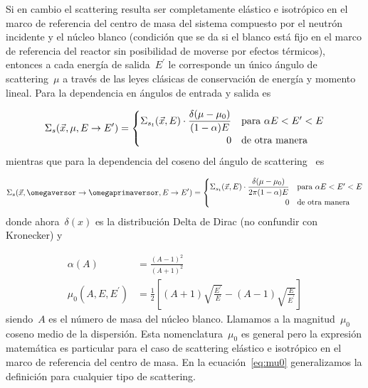 \medskip

Si en cambio el scattering resulta ser completamente elástico e isotrópico en el marco de referencia del centro de masa del sistema compuesto por el neutrón incidente y el núcleo blanco (condición que se da si el blanco está fijo en el marco de referencia del reactor sin posibilidad de moverse por efectos térmicos), entonces a cada energía de salida~$E^\prime$ le corresponde un único ángulo de scattering~$\mu$ a través de las leyes clásicas de conservación de energía y momento lineal. Para la dependencia en ángulos de entrada y salida \cite{stammler} es

\begin{equation*}
 \Sigma_s(\vec{x}, \mu, E \rightarrow E^\prime) =
\begin{cases}
 \displaystyle \Sigma_{s_t}(\vec{x}, E) \cdot \frac{\delta(\mu - \mu_0)}{(1-\alpha)E}  & \text{para}~\alpha E < E^\prime < E \\
\hfill 0 \hfil & \text{de otra manera}
\end{cases}
\end{equation*}
%
mientras que para la dependencia del coseno del ángulo de scattering~\cite{lewis} es

\begin{equation*}
 \Sigma_s(\vec{x}, \omegaversor \rightarrow \omegaprimaversor, E \rightarrow E^\prime) =
\begin{cases}
 \displaystyle \Sigma_{s_t}(\vec{x}, E) \cdot \frac{\delta(\mu - \mu_0)}{2\pi(1-\alpha)E}  & \text{para}~\alpha E < E^\prime < E \\
\hfill 0 \hfil & \text{de otra manera}
\end{cases}
\end{equation*}
%
donde ahora~$\delta(x)$ es la distribución Delta de Dirac (no confundir con Kronecker) y

\begin{align*}
 \alpha(A) &= \frac{(A-1)^2}{(A+1)^2} \\
 \mu_0(A,E,E^\prime) &= \frac{1}{2} \left[ (A+1)\sqrt{\frac{E^\prime}{E}} - (A-1) \sqrt{\frac{E}{E^\prime}} \right]
\end{align*}
%
siendo~$A$ es el número de masa del núcleo blanco. Llamamos a la magnitud~$\mu_0$ coseno medio de la dispersión. Esta nomenclatura~$\mu_0$ es general pero la expresión matemática es particular para el caso de scattering elástico e isotrópico en el marco de referencia del centro de masa. En la ecuación~\eqref{eq:mu0} generalizamos la definición para cualquier tipo de scattering.

